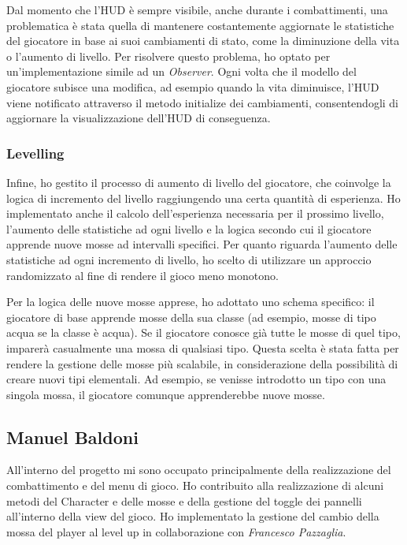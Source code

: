 \documentclass[a4paper,12pt]{report}
\begin{document}
Dal momento che l'HUD è sempre visibile, anche durante i combattimenti, una problematica è stata quella di mantenere costantemente aggiornate le statistiche del giocatore in base ai suoi cambiamenti di stato, come la diminuzione della vita o l'aumento di livello. Per risolvere questo problema, ho optato per un'implementazione simile ad un \textit{Observer}. Ogni volta che il modello del giocatore subisce una modifica, ad esempio quando la vita diminuisce, l'HUD viene notificato attraverso il metodo initialize dei cambiamenti, consentendogli di aggiornare la visualizzazione dell'HUD di conseguenza.
\subsubsection{Levelling} \label{ss:leveling}
Infine, ho gestito il processo di aumento di livello del giocatore, che coinvolge la logica di incremento del livello raggiungendo una certa quantità di esperienza. Ho implementato anche il calcolo dell'esperienza necessaria per il prossimo livello, l'aumento delle statistiche ad ogni livello e la logica secondo cui il giocatore apprende nuove mosse ad intervalli specifici.
Per quanto riguarda l'aumento delle statistiche ad ogni incremento di livello, ho scelto di utilizzare un approccio randomizzato al fine di rendere il gioco meno monotono.

Per la logica delle nuove mosse apprese, ho adottato uno schema specifico: il giocatore di base apprende mosse della sua classe (ad esempio, mosse di tipo acqua se la classe è acqua). Se il giocatore conosce già tutte le mosse di quel tipo, imparerà casualmente una mossa di qualsiasi tipo. Questa scelta è stata fatta per rendere la gestione delle mosse più scalabile, in considerazione della possibilità di creare nuovi tipi elementali. Ad esempio, se venisse introdotto un tipo con una singola mossa, il giocatore comunque apprenderebbe nuove mosse.

\subsection{Manuel Baldoni}
All'interno del progetto mi sono occupato principalmente della realizzazione del combattimento e del menu di gioco. Ho contribuito alla realizzazione di alcuni metodi del Character e delle mosse e della gestione del toggle dei pannelli all'interno della view del gioco. Ho implementato la gestione del cambio della mossa del player al level up in collaborazione con \textit{Francesco Pazzaglia}.
\end{document}
